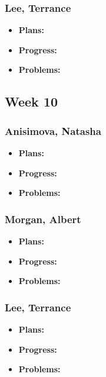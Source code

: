 \documentclass[10pt,draftclsnofoot,onecolumn]{IEEEtran}
\begin{document}
\subsubsection{Lee, Terrance}
\begin{itemize}
	\item \textbf{Plans:}
	\item \textbf{Progress:}
	\item \textbf{Problems:}
\end{itemize}
\subsection{Week 10}
\subsubsection{Anisimova, Natasha}
\begin{itemize}
	\item \textbf{Plans:}
	\item \textbf{Progress:}
	\item \textbf{Problems:}
\end{itemize}
\subsubsection{Morgan, Albert}
\begin{itemize}
	\item \textbf{Plans:}
	\item \textbf{Progress:}
	\item \textbf{Problems:}
\end{itemize}
\subsubsection{Lee, Terrance}
\begin{itemize}
	\item \textbf{Plans:}
	\item \textbf{Progress:}
	\item \textbf{Problems:}
\end{itemize}
\end{document}
